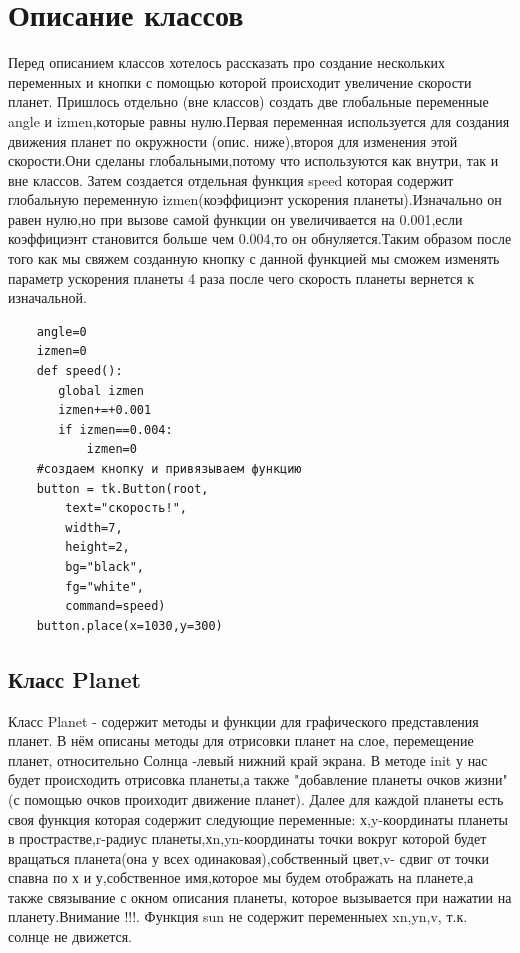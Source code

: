 \documentclass[11pt,a4paper]{report}
\begin{document}
\section{Описание классов}
Перед описанием классов хотелось рассказать про создание нескольких переменных и кнопки с помощью которой происходит увеличение скорости планет.
Пришлось отдельно (вне классов) создать две глобальные переменные angle и izmen,которые равны нулю.Первая переменная используется для создания движения планет по окружности (опис. ниже),второя для изменения этой скорости.Они сделаны глобальными,потому что используются как внутри, так и вне классов.
Затем создается отдельная функция speed которая содержит глобальную переменную izmen(коэффициэнт ускорения планеты).Изначально он равен нулю,но при вызове самой функции он увеличивается на 0.001,если коэффициэнт становится больше чем 0.004,то он обнуляется.Таким образом после того как мы свяжем созданную кнопку с данной функцией мы сможем изменять параметр ускорения планеты 4 раза после чего скорость планеты вернется к изначальной.
\begin{verbatim}
    angle=0
    izmen=0
    def speed():
       global izmen   
       izmen+=+0.001
       if izmen==0.004:
           izmen=0
    #создаем кнопку и привязываем функцию   
    button = tk.Button(root,
        text="скорость!",
        width=7,
        height=2,
        bg="black",
        fg="white",
        command=speed)
    button.place(x=1030,y=300)
\end{verbatim}
\subsection{Класс Planet}
Класс Planet  - содержит методы и функции для графического представления планет. В нём описаны методы для отрисовки планет на слое, перемещение планет, относительно Солнца -левый нижний край экрана.
В методе init у нас будет происходить отрисовка планеты,а также "добавление планеты очков  жизни"(с помощью очков проиходит движение планет).
Далее для каждой планеты есть своя функция которая содержит следующие переменные: х,y-координаты планеты в прострастве,r-радиус планеты,хn,yn-координаты точки вокруг которой будет вращаться планета(она у всех одинаковая),собственный цвет,v- сдвиг от точки спавна по х и у,собственное имя,которое мы будем отображать на планете,а также связывание с окном описания планеты, которое вызывается при нажатии на планету.Внимание !!!. Функция sun не содержит переменныех xn,yn,v, т.к. солнце не движется.
\end{document}
